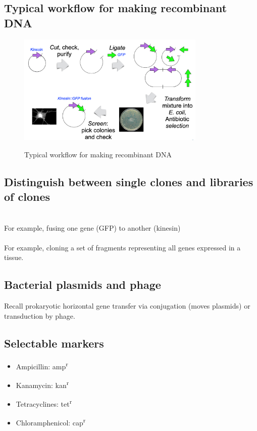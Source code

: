 \subsection{Typical workflow for making recombinant DNA}
\begin{figure}[h]
\centering
\includegraphics[width=0.8\textwidth]{images/lecture4-1.png}\\[.2in]
\caption{Typical workflow for making recombinant DNA} 
\end{figure}
\subsection{Distinguish between single clones and libraries of clones}
\\[.1in]
For example, fusing one gene (GFP) to another (kinesin)\\[.2in]
\\[.1in]
For example, cloning a set of fragments representing all genes expressed in a tissue.
\subsection{Bacterial plasmids and phage}
Recall prokaryotic horizontal gene transfer via conjugation (moves plasmids) or transduction by phage.
\subsection{Selectable markers}
\begin{itemize}
    \item Ampicillin: amp\textsuperscript{r}
    \item Kanamycin: kan\textsuperscript{r}
    \item Tetracyclines: tet\textsuperscript{r}
    \item Chloramphenicol: cap\textsuperscript{r}
\end{itemize}
